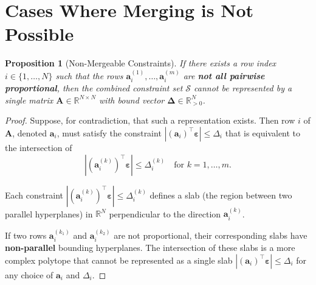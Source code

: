 \documentclass{article}
\newtheorem{proposition}{Proposition}
\begin{document}
\section{Cases Where Merging is Not Possible}

\begin{proposition}[Non-Mergeable Constraints]
\label{prop:nonmergeable}
If there exists a row index $i \in \{1, \ldots, N\}$ such that the rows $\mathbf{a}_i^{(1)}, \ldots, \mathbf{a}_i^{(m)}$ are \textbf{not all pairwise proportional}, then the combined constraint set $\mathcal{S}$ cannot be represented by a single matrix $\mathbf{A} \in \mathbb{R}^{N \times N}$ with bound vector $\boldsymbol{\Delta} \in \mathbb{R}^N_{>0}$.
\end{proposition}

\begin{proof}
Suppose, for contradiction, that such a representation exists. Then row $i$ of $\mathbf{A}$, denoted $\mathbf{a}_i$, must satisfy the constraint $|(\mathbf{a}_i)^\top \boldsymbol{\varepsilon}| \leq \Delta_i$ that is equivalent to the intersection of
\begin{equation}
    |(\mathbf{a}_i^{(k)})^\top \boldsymbol{\varepsilon}| \leq \Delta_i^{(k)} \quad \text{for } k = 1, \ldots, m.
\end{equation}

Each constraint $|(\mathbf{a}_i^{(k)})^\top \boldsymbol{\varepsilon}| \leq \Delta_i^{(k)}$ defines a slab (the region between two parallel hyperplanes) in $\mathbb{R}^N$ perpendicular to the direction $\mathbf{a}_i^{(k)}$.

If two rows $\mathbf{a}_i^{(k_1)}$ and $\mathbf{a}_i^{(k_2)}$ are not proportional, their corresponding slabs have \textbf{non-parallel} bounding hyperplanes. The intersection of these slabs is a more complex polytope that cannot be represented as a single slab $|(\mathbf{a}_i)^\top \boldsymbol{\varepsilon}| \leq \Delta_i$ for any choice of $\mathbf{a}_i$ and $\Delta_i$.
\end{proof}
\end{document}
